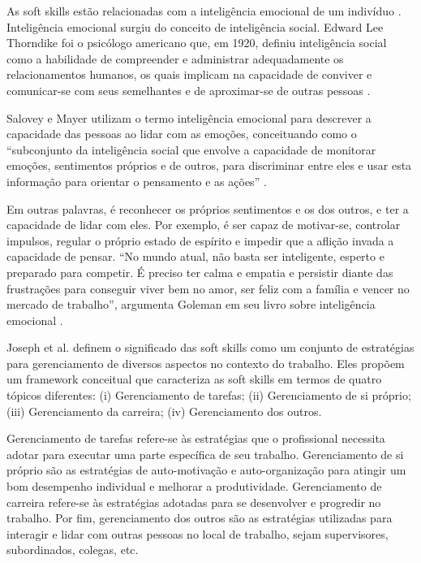 As soft skills estão relacionadas com a inteligência emocional de um indivíduo \cite{hjyunus:12}. Inteligência emocional surgiu do conceito de inteligência social. Edward Lee Thorndike foi o psicólogo americano que, em 1920, definiu inteligência social como a habilidade de compreender e administrar adequadamente os relacionamentos humanos, os quais implicam na capacidade de conviver e comunicar-se com seus semelhantes e de aproximar-se de outras pessoas \cite{thornlike:20}.

Salovey e Mayer utilizam o termo inteligência emocional para descrever a capacidade das pessoas ao lidar com as emoções, conceituando como o ``subconjunto da inteligência social que envolve a capacidade de monitorar emoções, sentimentos próprios e de outros, para discriminar entre eles e usar esta informação para orientar o pensamento e as ações'' \cite{salovey:90}.

Em outras palavras, é reconhecer os próprios sentimentos e os dos outros, e ter a capacidade de lidar com eles. Por exemplo, é ser capaz de motivar-se, controlar impulsos, regular o próprio estado de espírito e impedir que a aflição invada a capacidade de pensar. ``No mundo atual, não basta ser inteligente, esperto e preparado para competir. É preciso ter calma e empatia e persistir diante das frustrações para conseguir viver bem no amor, ser feliz com a família e vencer no mercado de trabalho'', argumenta Goleman em seu livro sobre inteligência emocional \cite{goleman:07}.

Joseph et al. \cite{joseph:99} \cite{joseph:10} definem o significado das soft skills como um conjunto de estratégias para gerenciamento de diversos aspectos no contexto do trabalho. Eles propõem um framework conceitual que caracteriza as soft skills em termos de quatro tópicos diferentes: (i) Gerenciamento de tarefas; (ii) Gerenciamento de si próprio; (iii) Gerenciamento da carreira; (iv) Gerenciamento dos outros.

Gerenciamento de tarefas refere-se às estratégias que o profissional necessita adotar para executar uma parte específica de seu trabalho. Gerenciamento de si próprio são as estratégias de auto-motivação e auto-organização para atingir um bom desempenho individual e melhorar a produtividade. Gerenciamento de carreira refere-se às estratégias adotadas para se desenvolver e progredir no trabalho. Por fim, gerenciamento dos outros são as estratégias utilizadas para interagir e lidar com outras pessoas no local de trabalho, sejam supervisores, subordinados, colegas, etc.

